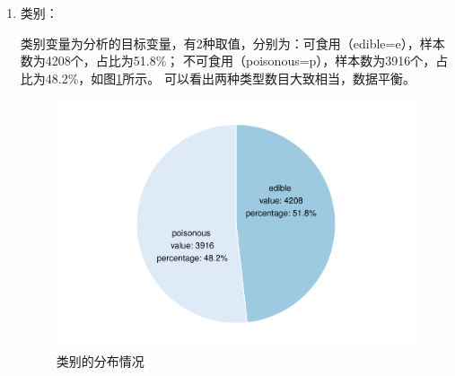 \documentclass[lang=cn,11pt,a4paper,cite=super]{elegantpaper}
\begin{document}
\begin{enumerate}
   \item 类别：\par
   类别变量为分析的目标变量，有2种取值，分别为：可食用（edible=e），样本数为4208个，占比为51.8\%；
   不可食用（poisonous=p），样本数为3916个，占比为48.2\%，如图\ref{fig:class}所示。
   可以看出两种类型数目大致相当，数据平衡。
   \begin{figure}[!hbt]
      \centering
      \includegraphics[width=0.6\linewidth]{img/class_pie-1.pdf}
      \caption{类别的分布情况}
      \label{fig:class}
   \end{figure}
   

\end{enumerate}
\end{document}
